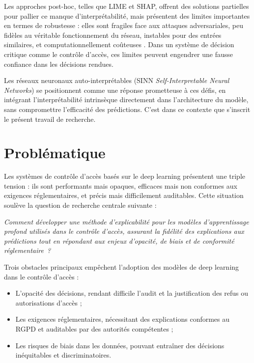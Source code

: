 \documentclass[12pt,a4paper]{article}
\begin{document}
Les approches post-hoc, telles que LIME et SHAP, offrent des solutions partielles pour pallier ce manque d'interpr\'etabilit\'e, mais pr\'esentent des limites importantes en termes de robustesse \cite{rudin2019}: elles sont fragiles face aux attaques adversariales, peu fid\`eles au v\'eritable fonctionnement du r\'eseau, instables pour des entr\'ees similaires, et computationnellement co\^uteuses \cite{slack2020}. Dans un syst\`eme de d\'ecision critique comme le contr\^ole d'acc\`es, ces limites peuvent engendrer une fausse confiance dans les d\'ecisions rendues.

Les r\'eseaux neuronaux auto-interpr\'etables (SINN \textit{Self-Interpretable Neural Networks}) se positionnent comme une r\'eponse prometteuse \`a ces d\'efis, en int\'egrant l'interpr\'etabilit\'e intrins\`eque directement dans l'architecture du mod\`ele, sans compromettre l'efficacit\'e des pr\'edictions. C'est dans ce contexte que s'inscrit le pr\'esent travail de recherche.

\section{Probl\'ematique}

Les syst\`emes de contr\^ole d'acc\`es bas\'es sur le deep learning pr\'esentent une triple tension : ils sont performants mais opaques, efficaces mais non conformes aux exigences r\'eglementaires, et pr\'ecis mais difficilement auditables. Cette situation soul\`eve la question de recherche centrale suivante :

\begin{questionbox}
\textit{Comment d\'evelopper une m\'ethode d'explicabilit\'e pour les mod\`eles d'apprentissage profond utilis\'es dans le contr\^ole d'acc\`es, assurant la fid\'elit\'e des explications aux pr\'edictions tout en r\'epondant aux enjeux d'opacit\'e, de biais et de conformit\'e r\'eglementaire~?}
\end{questionbox}

Trois obstacles principaux emp\^echent l'adoption des mod\`eles de deep learning dans le contr\^ole d'acc\`es :

\begin{itemize}
  \item L'opacit\'e des d\'ecisions, rendant difficile l'audit et la justification des refus ou autorisations d'acc\`es ;
  \item Les exigences r\'eglementaires, n\'ecessitant des explications conformes au RGPD et auditables par des autorit\'es comp\'etentes ;
  \item Les risques de biais dans les donn\'ees, pouvant entra\^iner des d\'ecisions in\'equitables et discriminatoires.
\end{itemize}
\end{document}
